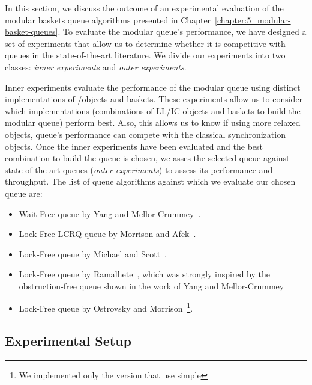 
In this section, we discuss the outcome of an experimental evaluation of the modular baskets queue algorithms presented in Chapter~\ref{chapter:5_modular-basket-queues}. To evaluate the modular queue's performance, we have designed a set of experiments that allow us to determine whether it is competitive with queues in the state-of-the-art literature. We divide our experiments into two classes: \textit{inner experiments} and \textit{outer experiments}.


Inner experiments evaluate the performance of the modular queue using distinct implementations of \LL/\IC objects and baskets. These experiments allow us to consider which implementations (combinations of LL/IC objects and baskets to build the modular queue) perform best. Also, this allows us to know if using more relaxed objects, queue's performance can compete with the classical synchronization objects. Once the inner experiments have been evaluated and the best combination to build the queue is chosen, we asses the selected queue against state-of-the-art queues (\textit{outer experiments}) to assess its performance and throughput. The list of queue algorithms against which we evaluate our chosen queue are:

\begin{itemize}
    \item Wait-Free queue by Yang and Mellor-Crummey~\cite{DBLP_conf_ppopp_YangM16}.
    \item Lock-Free LCRQ queue by Morrison and Afek~\cite{ppopp2013x86queues}.
    \item Lock-Free queue by Michael and Scott~\cite{DBLP_conf_podc_MichaelS96}.
    \item Lock-Free queue by Ramalhete~\cite{Ramalhete_Correia_MPMC_2016}, which was strongly inspired by the obstruction\hyp{}free queue shown in the work of Yang and Mellor-Crummey~\cite{DBLP_conf_ppopp_YangM16}
    \item Lock-Free queue by Ostrovsky and Morrison~\cite{scalingconcurrent2020}\footnote{We implemented only the version that use simple \CAS}.
\end{itemize}

\subsection{\label{subsec:queue-experimental-setup}Experimental Setup}
